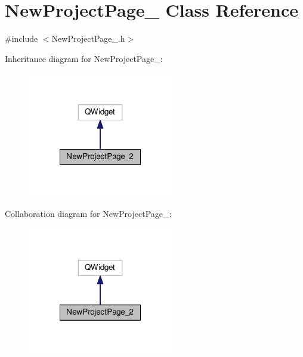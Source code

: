 \hypertarget{class_new_project_page__2}{\section{New\-Project\-Page\-\_ Class Reference}
\label{class_new_project_page__2}
}


{\ttfamily \#include $<$New\-Project\-Page\-\_.\-h$>$}



Inheritance diagram for New\-Project\-Page\-\_\-:\nopagebreak
\begin{figure}[H]
\begin{center}
\leavevmode
\includegraphics[width=180pt]{class_new_project_page__2__inherit__graph}
\end{center}
\end{figure}


Collaboration diagram for New\-Project\-Page\-\_\-:\nopagebreak
\begin{figure}[H]
\begin{center}
\leavevmode
\includegraphics[width=180pt]{class_new_project_page__2__coll__graph}
\end{center}
\end{figure}
